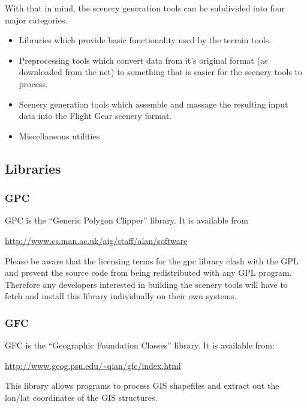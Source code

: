 \documentclass[12pt]{article}
\begin{document}
With that in mind, the scenery generation tools can be subdivided into
four major categories.

\begin{itemize}

\item Libraries which provide basic functionality used by the terrain
  tools.

\item Preprocessing tools which convert data from it's original format
  (as downloaded from the net) to something that is easier for the
  scenery tools to process.

\item Scenery generation tools which assemble and massage the
  resulting input data into the Flight Gear scenery format.

\item Miscellaneous utilities

\end{itemize}

\subsection{Libraries}


\subsubsection{GPC}

GPC is the ``Generic Polygon Clipper'' library.  It is available from

\url{http://www.cs.man.ac.uk/aig/staff/alan/software}

Please be aware that the licensing terms for the gpc library clash
with the GPL and prevent the source code from being redistributed with
any GPL program.  Therefore any developers interested in building the
scenery tools will have to fetch and install this library individually
on their own systems.

\subsubsection{GFC}
 
GFC is the ``Geographic Foundation Classes'' library.  It is available
from:

\url{http://www.geog.psu.edu/~qian/gfc/index.html}

This library allows programs to process GIS shapefiles and extract out
the lon/lat coordinates of the GIS structures.
\end{document}
